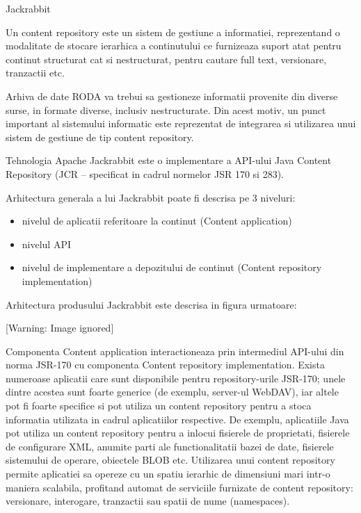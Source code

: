 \documentclass{article}
\title{}
\begin{document}
Jackrabbit


\bigskip

Un content repository este un sistem de gestiune a informatiei, reprezentand o modalitate de stocare ierarhica a continutului ce furnizeaza suport atat pentru continut structurat cat si nestructurat, pentru cautare full text, versionare, tranzactii etc.


\bigskip

Arhiva de date RODA va trebui sa gestioneze informatii provenite din diverse surse, in formate diverse, inclusiv nestructurate. Din acest motiv, un punct important al sistemului informatic este reprezentat de integrarea si utilizarea unui sistem de gestiune de tip content repository. 


\bigskip

Tehnologia Apache Jackrabbit este o implementare a API-ului Java Content Repository (JCR -- specificat in cadrul normelor JSR 170 si 283).


\bigskip

Arhitectura generala a lui Jackrabbit poate fi descrisa pe 3 niveluri:

\begin{itemize}
\item nivelul de aplicatii referitoare la continut (Content application)
\item nivelul API
\item nivelul de implementare a depozitului de continut (Content repository implementation)
\end{itemize}

\bigskip

Arhitectura produsului Jackrabbit este descrisa in figura urmatoare:


\bigskip



\begin{center}
 [Warning: Image ignored] %

\end{center}

\bigskip

Componenta Content application interactioneaza prin intermediul API-ului din norma JSR-170 cu componenta Content repository implementation. Exista numeroase aplicatii care sunt disponibile pentru repository{}-urile JSR-170; unele dintre acestea sunt foarte generice (de exemplu, server-ul WebDAV), iar altele pot fi foarte specifice si pot utiliza un content repository pentru a stoca informatia utilizata in cadrul aplicatiilor respective. De exemplu, aplicatiile Java pot utiliza un content repository pentru a inlocui fisierele de proprietati, fisierele de configurare XML, anumite parti ale functionalitatii bazei de date, fisierele sistemului de operare, obiectele BLOB etc. Utilizarea unui content repository permite aplicatiei sa opereze cu un spatiu ierarhic de dimensiuni mari intr-o maniera scalabila, profitand automat de serviciile furnizate de content repository: versionare, interogare, tranzactii sau spatii de nume (namespaces). 
\end{document}

